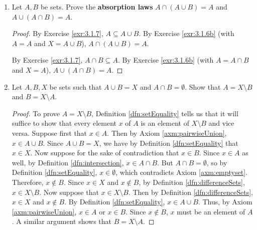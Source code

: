 \documentclass[../main.tex]{subfiles}
\begin{document}
\begin{enumerate}[ref={\thesection.\arabic*}]
\begin{proof}
        To prove that $A\subseteq C$ and $B\subseteq C$ iff $A\cup B\subseteq C$, it will suffice to show that $A\subseteq C$ and $B\subseteq C$ imply $A\cup B\subseteq C$ and vice versa. Suppose first that $A\subseteq C$ and $B\subseteq C$. By Axiom \ref{axm:pairwiseUnion}, $x\in A\cup B \Longrightarrow (x\in A\text{ or }x\in B)$. We divide into two cases. If $x\in A$, then Definition \ref{dfn:subsets} ensures that $x\in C$. If $x\in B$, then Definition \ref{dfn:subsets} similarly ensures that $x\in C$. Thus, either way, $x\in A\cup B \Longrightarrow x\in C$, so by Definition \ref{dfn:subsets}, $A\cup B\subseteq C$. Now suppose that $A\cup B\subseteq C$. By Axiom \ref{axm:pairwiseUnion} followed by Definition \ref{dfn:subsets}, $x\in A \Longrightarrow x\in A\cup B \Longrightarrow x\in C$. A similar argument shows that $x\in B \Longrightarrow x\in C$. Thus, $A\subseteq C$ and $B\subseteq C$.
    \end{proof}
    \item \label{exr:3.1.8}Let $A,B$ be sets. Prove the \textbf{absorption laws} $A\cap(A\cup B)=A$ and $A\cup(A\cap B)=A$.
    \begin{proof}
        By Exercise \ref{exr:3.1.7}, $A\subseteq A\cup B$. By Exercise \ref{exr:3.1.6b} (with $A=A$ and $X=A\cup B$), $A\cap(A\cup B)=A$.\par
        By Exercise \ref{exr:3.1.7}, $A\cap B\subseteq A$. By Exercise \ref{exr:3.1.6b} (with $A=A\cap B$ and $X=A$), $A\cup(A\cap B)=A$.
    \end{proof}
    \item \label{exr:3.1.9}Let $A,B,X$ be sets such that $A\cup B=X$ and $A\cap B=\emptyset$. Show that $A=X\setminus B$ and $B=X\setminus A$.
    \begin{proof}
        To prove $A=X\setminus B$, Definition \ref{dfn:setEquality} tells us that it will suffice to show that every element $x$ of $A$ is an element of $X\setminus B$ and vice versa. Suppose first that $x\in A$. Then by Axiom \ref{axm:pairwiseUnion}, $x\in A\cup B$. Since $A\cup B=X$, we have by Definition \ref{dfn:setEquality} that $x\in X$. Now suppose for the sake of contradiction that $x\in B$. Since $x\in A$ as well, by Definition \ref{dfn:intersection}, $x\in A\cap B$. But $A\cap B=\emptyset$, so by Definition \ref{dfn:setEquality}, $x\in\emptyset$, which contradicts Axiom \ref{axm:emptyset}. Therefore, $x\notin B$. Since $x\in X$ and $x\notin B$, by Definition \ref{dfn:differenceSets}, $x\in X\setminus B$. Now suppose that $x\in X\setminus B$. Then by Definition \ref{dfn:differenceSets}, $x\in X$ and $x\notin B$. By Definition \ref{dfn:setEquality}, $x\in A\cup B$. Thus, by Axiom \ref{axm:pairwiseUnion}, $x\in A$ or $x\in B$. Since $x\notin B$, $x$ must be an element of $A$. A similar argument shows that $B=X\setminus A$.

\end{proof}
\end{enumerate}
\end{document}
